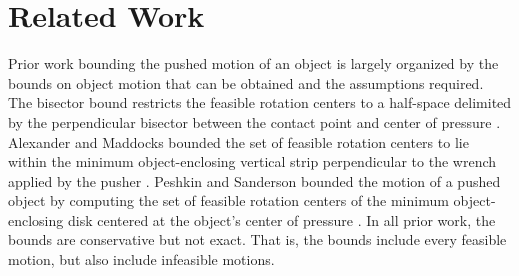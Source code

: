 \documentclass[conference]{IEEEtran}
\begin{document}



\section{Related Work}\label{sec:related-work}


Prior work bounding the pushed motion of an object is largely
organized by the bounds on object motion that can be obtained and the
assumptions required.
The bisector bound restricts the feasible rotation centers to a
half-space delimited by the perpendicular bisector between the contact
point and center of pressure \cite{Mason}.  Alexander and Maddocks
bounded the set of feasible rotation centers to lie within the minimum
object-enclosing vertical strip perpendicular to the wrench applied by
the pusher \cite{alexander1993bounds}.  Peshkin and Sanderson bounded
the motion of a pushed object by computing the set of feasible
rotation centers of the minimum object-enclosing disk centered at the
object's center of pressure \cite{peshkin1988motion}. In all prior
work, the bounds are conservative but not exact. That is, the bounds
include every feasible motion, but also include infeasible motions.
\end{document}

